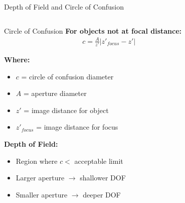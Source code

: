 \begin{frame}{Depth of Field and Circle of Confusion}
  \begin{columns}
    \begin{column}{0.5\textwidth}
      \begin{mathbox}{Circle of Confusion}
        \textbf{For objects not at focal distance:}
        \begin{align}
          c = \frac{A}{z'} \left| z'_{focus} - z' \right|
        \end{align}

        \textbf{Where:}
        \begin{itemize}
          \item $c$ = circle of confusion diameter
          \item $A$ = aperture diameter
          \item $z'$ = image distance for object
          \item $z'_{focus}$ = image distance for focus
        \end{itemize}

        \vspace{0.3cm}
        \textbf{Depth of Field:}
        \begin{itemize}
          \item Region where $c < $ acceptable limit
          \item Larger aperture $\rightarrow$ shallower DOF
          \item Smaller aperture $\rightarrow$ deeper DOF
        \end{itemize}
      \end{mathbox}
    \end{column}
    \begin{column}{0.5\textwidth}
\end{column}
\end{columns}
\end{frame}
